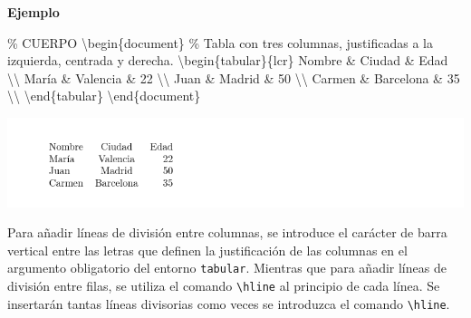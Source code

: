 \documentclass[
  letterpaper,
  DIV=11,
  numbers=noendperiod]{scrreport}
\newenvironment{Shaded}{\begin{snugshade}}{\end{snugshade}}
\newcommand{\CommentTok}[1]{\textcolor[rgb]{0.37,0.37,0.37}{#1}}
\newcommand{\ExtensionTok}[1]{\textcolor[rgb]{0.00,0.23,0.31}{#1}}
\newcommand{\FunctionTok}[1]{\textcolor[rgb]{0.28,0.35,0.67}{#1}}
\newcommand{\KeywordTok}[1]{\textcolor[rgb]{0.00,0.23,0.31}{#1}}
\newcommand{\NormalTok}[1]{\textcolor[rgb]{0.00,0.23,0.31}{#1}}
\newcommand{\OperatorTok}[1]{\textcolor[rgb]{0.37,0.37,0.37}{#1}}
\begin{document}
\textbf{Ejemplo}

\begin{Shaded}
\begin{Highlighting}[]
\CommentTok{\% CUERPO}
\KeywordTok{\textbackslash{}begin}\NormalTok{\{}\ExtensionTok{document}\NormalTok{\}}
\CommentTok{\% Tabla con tres columnas, justificadas a la izquierda, centrada y derecha.}
\KeywordTok{\textbackslash{}begin}\NormalTok{\{}\ExtensionTok{tabular}\NormalTok{\}\{lcr\}}
\NormalTok{Nombre }\OperatorTok{\&}\NormalTok{ Ciudad }\OperatorTok{\&}\NormalTok{ Edad }\FunctionTok{\textbackslash{}\textbackslash{}}
\NormalTok{María }\OperatorTok{\&}\NormalTok{ Valencia }\OperatorTok{\&}\NormalTok{ 22 }\FunctionTok{\textbackslash{}\textbackslash{}}
\NormalTok{Juan }\OperatorTok{\&}\NormalTok{ Madrid }\OperatorTok{\&}\NormalTok{ 50 }\FunctionTok{\textbackslash{}\textbackslash{}}
\NormalTok{Carmen }\OperatorTok{\&}\NormalTok{ Barcelona }\OperatorTok{\&}\NormalTok{ 35 }\FunctionTok{\textbackslash{}\textbackslash{}}
\KeywordTok{\textbackslash{}end}\NormalTok{\{}\ExtensionTok{tabular}\NormalTok{\}}
\KeywordTok{\textbackslash{}end}\NormalTok{\{}\ExtensionTok{document}\NormalTok{\}}
\end{Highlighting}
\end{Shaded}

\begin{tcolorbox}[enhanced jigsaw, arc=.35mm, toprule=.15mm, opacitybacktitle=0.6, colback=white, coltitle=black, colbacktitle=quarto-callout-note-color!10!white, breakable, colframe=quarto-callout-note-color-frame, left=2mm, opacityback=0, bottomtitle=1mm, toptitle=1mm, titlerule=0mm, title={Salida}, bottomrule=.15mm, leftrule=.75mm, rightrule=.15mm]
\includegraphics{./img/tablas/tabla-simple.png}
\end{tcolorbox}

Para añadir líneas de división entre columnas, se introduce el carácter
de barra vertical \texttt{\textbar{}} entre las letras que definen la
justificación de las columnas en el argumento obligatorio del entorno
\texttt{tabular}. Mientras que para añadir líneas de división entre
filas, se utiliza el comando \texttt{\textbackslash{}hline} al principio
de cada línea. Se insertarán tantas líneas divisorias como veces se
introduzca el comando \texttt{\textbackslash{}hline}.
\end{document}
